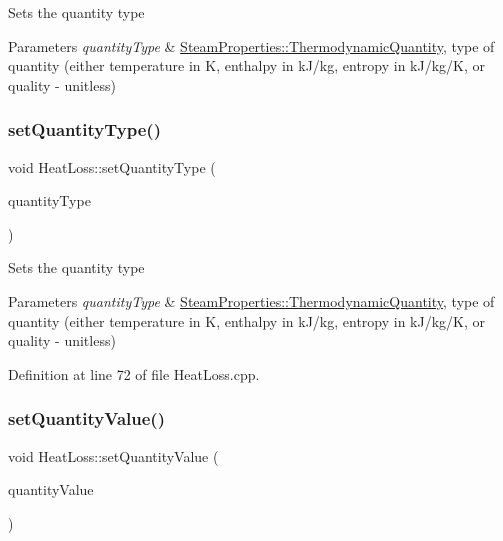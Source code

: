 Sets the quantity type 
\begin{DoxyParams}{Parameters}
{\em quantity\+Type} & \hyperlink{class_steam_properties_ae0294bedf7d178c2d8fb6aed0f62fbff}{Steam\+Properties\+::\+Thermodynamic\+Quantity}, type of quantity (either temperature in K, enthalpy in k\+J/kg, entropy in k\+J/kg/K, or quality -\/ unitless) \\
\hline
\end{DoxyParams}
\mbox{\label{class_heat_loss_a7c125f1137f31eba8826a1aa3b905290}} 
\subsubsection{\texorpdfstring{set\+Quantity\+Type()}{setQuantityType()}\hspace{0.1cm}{\footnotesize\ttfamily [3/3]}}
{\footnotesize\ttfamily void Heat\+Loss\+::set\+Quantity\+Type (\begin{DoxyParamCaption}\item[{\hyperlink{class_steam_properties_ae0294bedf7d178c2d8fb6aed0f62fbff}{Steam\+Properties\+::\+Thermodynamic\+Quantity}}]{quantity\+Type }\end{DoxyParamCaption})}

Sets the quantity type 
\begin{DoxyParams}{Parameters}
{\em quantity\+Type} & \hyperlink{class_steam_properties_ae0294bedf7d178c2d8fb6aed0f62fbff}{Steam\+Properties\+::\+Thermodynamic\+Quantity}, type of quantity (either temperature in K, enthalpy in k\+J/kg, entropy in k\+J/kg/K, or quality -\/ unitless) \\
\hline
\end{DoxyParams}


Definition at line 72 of file Heat\+Loss.\+cpp.

\mbox{\label{class_heat_loss_ae6b6c4ac28471d7bc94e3886c48a90bd}} 
\subsubsection{\texorpdfstring{set\+Quantity\+Value()}{setQuantityValue()}\hspace{0.1cm}{\footnotesize\ttfamily [1/3]}}
{\footnotesize\ttfamily void Heat\+Loss\+::set\+Quantity\+Value (\begin{DoxyParamCaption}\item[{double}]{quantity\+Value }\end{DoxyParamCaption})}

